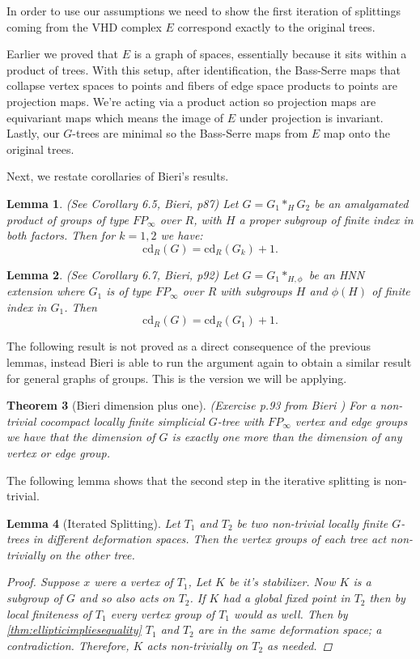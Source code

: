 \documentclass[12pt,parskip=full]{report}
\theoremstyle{plain}
\newtheorem{thm}{Theorem}[section]
\newtheorem{lem}[thm]{Lemma}
\theoremstyle{definition}
\begin{document}
In order to use our assumptions we need to show the first iteration of splittings coming from the VHD complex \(E\) correspond exactly to the original trees.

Earlier we proved that \(E\) is a graph of spaces, essentially because it sits within a product of trees. With this setup, after identification, the Bass-Serre maps that collapse vertex spaces to points and fibers of edge space products to points are projection maps. We're acting via a product action so projection maps are equivariant maps which means the image of \(E\) under projection is invariant. Lastly, our \(G\)-trees are minimal so the Bass-Serre maps from \(E\) map onto the original trees.

Next, we restate corollaries of Bieri's results.
\begin{lem}
(See Corollary 6.5, Bieri, p87)
Let \(G=G_1\ast_H G_2\) be an amalgamated product of groups of type \(FP_\infty\) over \(R\), with \(H\) a proper subgroup of finite index in both factors. Then for \(k=1,2\) we have: \[\text{cd}_R(G)=\text{cd}_R(G_k)+1.\]
\end{lem}

\begin{lem}
(See Corollary 6.7, Bieri, p92)
Let \(G=G_1\ast_{H,\phi}\) be an HNN extension where \(G_1\) is of type \(FP_\infty\) over \(R\) with subgroups \(H\) and \(\phi(H)\) of finite index in \(G_1\). Then \[\text{cd}_R(G) = \text{cd}_R(G_1)+1.\]
\end{lem}

The following result is not proved as a direct consequence of the previous lemmas, instead Bieri is able to run the argument again to obtain a similar result for general graphs of groups. This is the version we will be applying.
\begin{thm}
    [Bieri dimension plus one]
    \label{pro:bireridimension}
    (Exercise p.93 from Bieri \cite{bieribook})
    For a non-trivial cocompact locally finite simplicial \(G\)-tree with \(FP_\infty\) vertex and edge groups we have that the dimension of \(G\) is exactly one more than the dimension of any vertex or edge group.
\end{thm}

The following lemma shows that the second step in the iterative splitting is non-trivial.

\begin{lem}
    [Iterated Splitting]
    \label{lem:iteratedsplitting} 
    Let \(T_1\) and \(T_2\) be two non-trivial locally finite \(G\)-trees in different deformation spaces. Then the vertex groups of each tree act non-trivially on the other tree.
    \begin{proof}
        Suppose \(x\) were a vertex of \(T_1\), Let \(K\) be it's stabilizer. Now \(K\) is a subgroup of \(G\) and so also acts on \(T_2\). If \(K\) had a global fixed point in \(T_2\)  then by local finiteness of \(T_1\) every vertex group of \(T_1\) would as well. Then by \ref{thm:ellipticimpliesequality} \(T_1\) and \(T_2\) are in the same deformation space; a contradiction. Therefore, \(K\) acts non-trivially on \(T_2\) as needed.
    \end{proof}
\end{lem}
\end{document}
